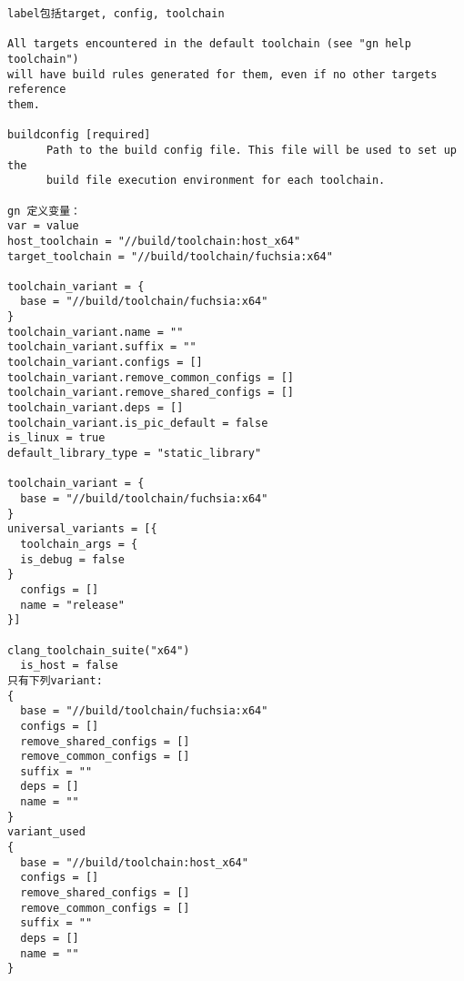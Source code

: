 \begin{verbatim}
label包括target, config, toolchain

All targets encountered in the default toolchain (see "gn help toolchain")
will have build rules generated for them, even if no other targets reference
them.

buildconfig [required]
      Path to the build config file. This file will be used to set up the
      build file execution environment for each toolchain.

gn 定义变量：
var = value
host_toolchain = "//build/toolchain:host_x64"
target_toolchain = "//build/toolchain/fuchsia:x64"

toolchain_variant = {
  base = "//build/toolchain/fuchsia:x64"
}
toolchain_variant.name = ""
toolchain_variant.suffix = ""
toolchain_variant.configs = []
toolchain_variant.remove_common_configs = []
toolchain_variant.remove_shared_configs = []
toolchain_variant.deps = []
toolchain_variant.is_pic_default = false
is_linux = true
default_library_type = "static_library"

toolchain_variant = {
  base = "//build/toolchain/fuchsia:x64"
}
universal_variants = [{
  toolchain_args = {
  is_debug = false
}
  configs = []
  name = "release"
}]

clang_toolchain_suite("x64")
  is_host = false
只有下列variant:
{
  base = "//build/toolchain/fuchsia:x64"
  configs = []
  remove_shared_configs = []
  remove_common_configs = []
  suffix = ""
  deps = []
  name = ""
}
variant_used
{
  base = "//build/toolchain:host_x64"
  configs = []
  remove_shared_configs = []
  remove_common_configs = []
  suffix = ""
  deps = []
  name = ""
}

\end{verbatim}
